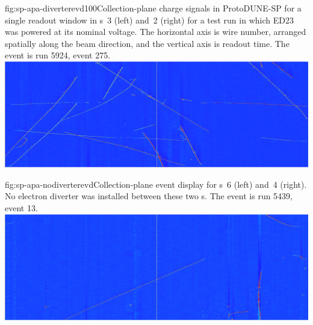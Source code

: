 \begin{dunefigure}{fig:sp-apa-diverterevd100}{Collection-plane charge signals in ProtoDUNE-SP for a single readout window in s~3 (left) and~2 (right) for a test run in which ED23 was powered at its nominal voltage.  The horizontal axis is wire number, arranged spatially along the beam direction, and the vertical axis is readout time.  The event is run 5924, event 275.}
    \includegraphics[width=\textwidth,trim=85mm 0mm 85mm 0mm,clip]{graphics/sp-apa-diverter100percent-R5924-E275-T1T5.png}
\end{dunefigure}

\begin{dunefigure}{fig:sp-apa-nodiverterevd}{Collection-plane event display for s~6 (left) and~4 (right). No electron diverter was installed between these two s.  The event is run 5439, event 13.}
    \includegraphics[width=\textwidth,trim=85mm 0mm 85mm 0mm,clip]{graphics/sp-apa-nodiverterevd.png}
\end{dunefigure}

